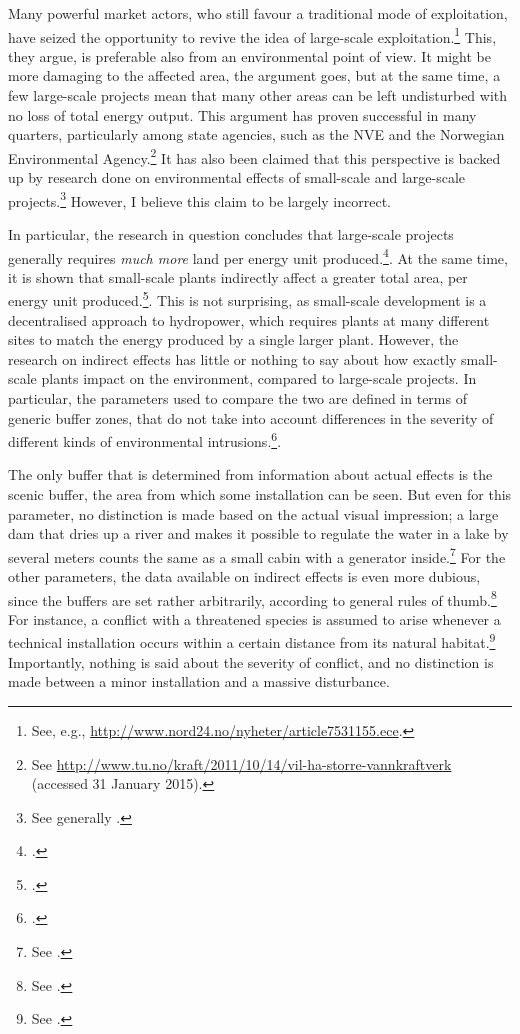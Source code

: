 Many powerful market actors, who still favour a traditional mode of exploitation, have seized the opportunity to revive the idea of large-scale exploitation.\footnote{See, e.g., \url{http://www.nord24.no/nyheter/article7531155.ece}.} This, they argue, is preferable also from an environmental point of view. It might be more damaging to the affected area, the argument goes, but at the same time, a few large-scale projects mean that many other areas can be left undisturbed with no loss of total energy output. This argument has proven successful in many quarters, particularly among state agencies, such as the NVE and the Norwegian Environmental Agency.\footnote{See \url{http://www.tu.no/kraft/2011/10/14/vil-ha-storre-vannkraftverk} (accessed 31 January 2015).} It has also been claimed that this perspective is backed up by research done on environmental effects of small-scale and large-scale projects.\footnote{See generally \cite{bakken12,bakken14}.} However, I believe this claim to be largely incorrect.

In particular, the research in question concludes that large-scale projects generally requires {\it much more} land per energy unit produced.\footcite[96]{bakken14}. At the same time, it is shown that small-scale plants indirectly affect a greater total area, per energy unit produced.\footcite[96-99]{bakken14}. This is not surprising, as small-scale development is a decentralised approach to hydropower, which requires plants at many different sites to match the energy produced by a single larger plant. However, the research on indirect effects has little or nothing to say about how exactly small-scale plants impact on the environment, compared to large-scale projects. In particular, the parameters used to compare the two are defined in terms of generic buffer zones, that do not take into account differences in the severity of different kinds of environmental intrusions.\footcite[95]{bakken14}.

The only buffer that is determined from information about actual effects is the scenic buffer, the area from which some installation can be seen. But even for this parameter, no distinction is made based on the actual visual impression; a large dam that dries up a river and makes it possible to regulate the water in a lake by several meters counts the same as a small cabin with a generator inside.\footnote{See \cite[95]{bakken14}.} For the other parameters, the data available on indirect effects is even more dubious, since the buffers are set rather arbitrarily, according to general rules of thumb.\footnote{See \cite[95]{bakken14}.} For instance, a conflict with a threatened species is assumed to arise whenever a technical installation occurs within a certain distance from its natural habitat.\footnote{See \cite[95]{bakken14}.} Importantly, nothing is said about the severity of conflict, and no distinction is made between a minor installation and a massive disturbance.

